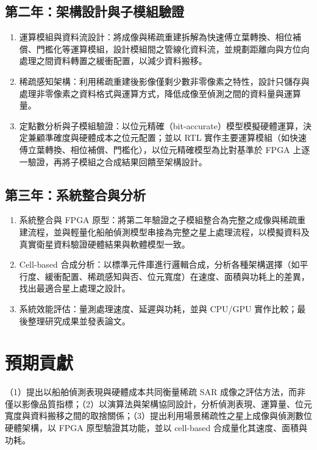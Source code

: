 \documentclass[11pt,fontset=none]{ctexart}
\begin{document}
\subsection{第二年：架構設計與子模組驗證}
\begin{enumerate}[label=(\arabic*), leftmargin=2.2em]
  \item 運算模組與資料流設計：將成像與稀疏重建拆解為快速傅立葉轉換、相位補償、門檻化等運算模組，設計模組間之管線化資料流，並規劃距離向與方位向處理之間資料轉置之緩衝配置，以減少資料搬移。
  \item 稀疏感知架構：利用稀疏重建後影像僅剩少數非零像素之特性，設計只儲存與處理非零像素之資料格式與運算方式，降低成像至偵測之間的資料量與運算量。
  \item 定點數分析與子模組驗證：以位元精確（bit-accurate）模型模擬硬體運算，決定兼顧準確度與硬體成本之位元配置；並以 RTL 實作主要運算模組（如快速傅立葉轉換、相位補償、門檻化），以位元精確模型為比對基準於 FPGA 上逐一驗證，再將子模組之合成結果回饋至架構設計。
\end{enumerate}

\subsection{第三年：系統整合與分析}
\begin{enumerate}[label=(\arabic*), leftmargin=2.2em]
  \item 系統整合與 FPGA 原型：將第二年驗證之子模組整合為完整之成像與稀疏重建流程，並與輕量化船舶偵測模型串接為完整之星上處理流程，以模擬資料及真實衛星資料驗證硬體結果與軟體模型一致。
  \item Cell-based 合成分析：以標準元件庫進行邏輯合成，分析各種架構選擇（如平行度、緩衝配置、稀疏感知與否、位元寬度）在速度、面積與功耗上的差異，找出最適合星上處理之設計。
  \item 系統效能評估：量測處理速度、延遲與功耗，並與 CPU/GPU 實作比較；最後整理研究成果並發表論文。
\end{enumerate}

\section{預期貢獻}

（1）提出以船舶偵測表現與硬體成本共同衡量稀疏 SAR 成像之評估方法，而非僅以影像品質指標；（2）以演算法與架構協同設計，分析偵測表現、運算量、位元寬度與資料搬移之間的取捨關係；（3）提出利用場景稀疏性之星上成像與偵測數位硬體架構，以 FPGA 原型驗證其功能，並以 cell-based 合成量化其速度、面積與功耗。
\end{document}
